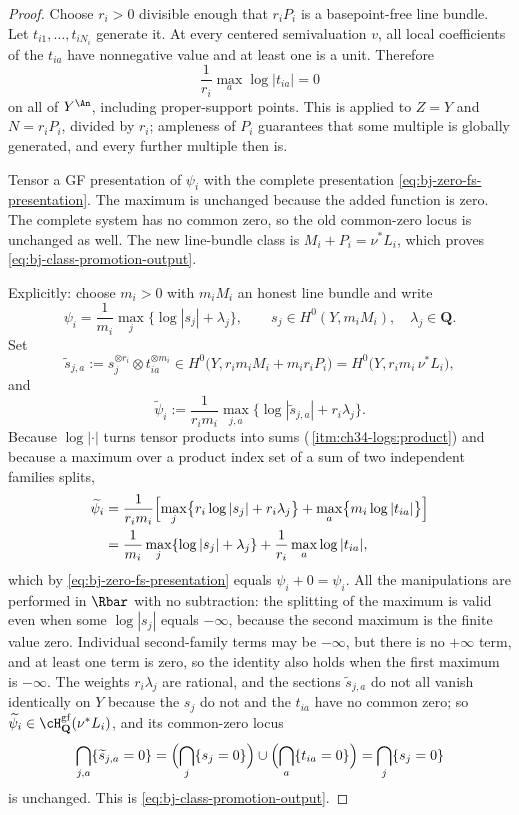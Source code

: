 \begin{proof}
Choose $r_i>0$ divisible enough that $r_iP_i$ is a basepoint-free line
bundle.
Let $t_{i1},\ldots,t_{iN_i}$ generate it.
At every centered semivaluation $v$, all local coefficients of the
$t_{ia}$ have nonnegative value and at least one is a unit.
Therefore
\[
                  \frac1{r_i}\max_a\log|t_{ia}|=0
\tag{43.9}\label{eq:bj-zero-fs-presentation}
\]
on all of $Y^{\An}$, including proper-support points.
This is  applied to $Z=Y$ and $N=r_iP_i$, divided
by $r_i$; ampleness of $P_i$ guarantees that some multiple is globally
generated, and every further multiple then is.

Tensor a GF presentation of $\psi_i$ with the complete presentation
\eqref{eq:bj-zero-fs-presentation}.
The maximum is unchanged because the added function is zero.
The complete system has no common zero, so the old common-zero locus is
unchanged as well.
The new line-bundle class is $M_i+P_i=\nu^*L_i$, which proves
\eqref{eq:bj-class-promotion-output}.

Explicitly: choose $m_i>0$ with $m_iM_i$ an honest line bundle and write
\[
 \psi_i=\frac1{m_i}\max_j\bigl\{\log|s_j|+\lambda_j\bigr\},
 \qquad
 s_j\in H^0(Y,m_iM_i),\quad\lambda_j\in\mathbf Q .
\]
Set
\[
 \widetilde s_{j,a}:=s_j^{\otimes r_i}\otimes t_{ia}^{\otimes m_i}
 \in H^0\bigl(Y,r_im_iM_i+m_ir_iP_i\bigr)
 =H^0\bigl(Y,r_im_i\,\nu^*L_i\bigr),
\]
and
\[
 \widetilde\psi_i
 :=\frac1{r_im_i}\max_{j,a}
   \bigl\{\log|\widetilde s_{j,a}|+r_i\lambda_j\bigr\}.
\]
Because $\log|\cdot|$ turns tensor products into sums
(\,\cref{itm:ch34-logs:product}) and because a
maximum over a product index set of a sum of two independent families splits,
\[
 \begin{aligned}
 \widetilde\psi_i
 &=\frac1{r_im_i}\Bigl[
   \max_j\bigl\{r_i\log|s_j|+r_i\lambda_j\bigr\}
   +\max_a\bigl\{m_i\log|t_{ia}|\bigr\}\Bigr]
 \\
 &=\frac1{m_i}\max_j\{\log|s_j|+\lambda_j\}
   +\frac1{r_i}\max_a\log|t_{ia}|,
 \end{aligned}
\]
which by \eqref{eq:bj-zero-fs-presentation} equals $\psi_i+0=\psi_i$.  All
the manipulations are performed in $\Rbar$ with no subtraction: the
splitting of the maximum is valid even when some $\log|s_j|$ equals
$-\infty$, because the second maximum is the finite value zero.  Individual second-family
terms may be $-\infty$, but there is no $+\infty$ term, and at least
one term is zero, so the identity also holds when the first maximum
is $-\infty$.  The weights $r_i\lambda_j$ are
rational, and the sections $\widetilde s_{j,a}$ do not all vanish
identically on $Y$ because the $s_j$ do not and the $t_{ia}$ have no
common zero; so
$\widetilde\psi_i\in\cH^{\mathrm{gf}}_{\mathbf Q}(\nu^*L_i)$, and its
common-zero locus
\[
 \bigcap_{j,a}\{\widetilde s_{j,a}=0\}
 =\Bigl(\bigcap_j\{s_j=0\}\Bigr)\cup\Bigl(\bigcap_a\{t_{ia}=0\}\Bigr)
 =\bigcap_j\{s_j=0\}
\]
is unchanged.  This is \eqref{eq:bj-class-promotion-output}.
\end{proof}

